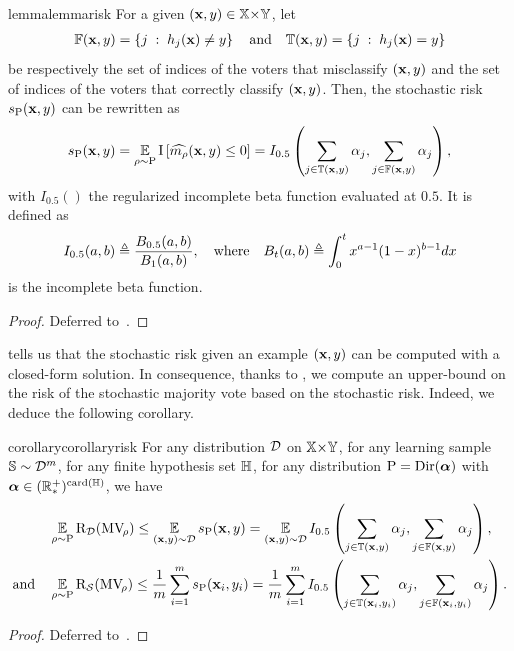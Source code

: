 \begin{restatable}{lemma}{lemmarisk}\label{chap:mv-sto:lemma:risk}
For a given $(\mathbf{x}, y) \in \mathbb{X}{\times}\mathbb{Y}$, let 
\begin{align*}
\mathbb{F}(\mathbf{x}, y) = \left\{ j \;:\; h_j(\mathbf{x}) \neq y \right\} \quad\text{and}\quad  \mathbb{T}(\mathbf{x}, y) = \left\{ j \;:\; h_j(\mathbf{x}) = y \right\}
\end{align*}
 be respectively the set of indices of the voters that misclassify $(\mathbf{x}, y)$ and the set of indices of the voters that correctly classify $(\mathbf{x}, y)$. 
Then, the stochastic risk $s_{\mathrm{P}}(\mathbf{x}, y)$ can be rewritten as
\begin{align*}
    s_{\mathrm{P}}(\mathbf{x}, y) = \operatorname*{\mathbb{E}}_{\rho\sim\mathrm{P}} \operatorname{I}\left[ \widehat{m_{\rho}}(\mathbf{x}, y) \le 0\right] =  I_{0.5}\left(\sum_{j\in \mathbb{T}(\mathbf{x}, y)} \alpha_j, \sum_{j\in \mathbb{F}(\mathbf{x}, y)} \alpha_j\right) ,
\end{align*}
with $I_{0.5}()$ the regularized incomplete beta function evaluated at $0.5$.
It is defined as
\begin{align*}
I_{0.5}(a, b)\triangleq \frac{B_{0.5}(a, b)}{B_1(a, b)}, \quad\text{where}\quad B_{t}(a, b) \triangleq \int_{0}^{t}x^{a-1}(1-x)^{b-1}dx
\end{align*}
is the incomplete beta function.
\end{restatable}
\begin{noaddcontents}\begin{proof}
Deferred to~.
\end{proof}\end{noaddcontents}

 tells us that the stochastic risk given an example $(\mathbf{x}, y)$ can be computed with a closed-form solution.
In consequence, thanks to , we compute an upper-bound on the risk of the stochastic majority vote based on the stochastic risk.
Indeed, we deduce the following corollary.

\begin{restatable}{corollary}{corollaryrisk}\label{chap:mv-sto:corollary:risk}
For any distribution $\mathcal{D}$ on $\mathbb{X}{\times}\mathbb{Y}$, for any learning sample $\mathbb{S}\sim\mathcal{D}^m$, for any finite hypothesis set $\mathbb{H}$, for any distribution $\mathrm{P}=\textrm{Dir}(\boldsymbol{\alpha})$ with $\boldsymbol{\alpha}\in(\mathbb{R}^{+}_{*})^{\operatorname{card}(\mathbb{H})}$, we have
\begin{align*}
&\operatorname*{\mathbb{E}}_{\rho\sim\mathrm{P}}\text{R}_{\mathcal{D}}(\text{MV}_{\!\rho}) \le \operatorname*{\mathbb{E}}_{(\mathbf{x},y)\sim\mathcal{D}}s_{\mathrm{P}}(\mathbf{x}, y) = \operatorname*{\mathbb{E}}_{(\mathbf{x},y)\sim\mathcal{D}} I_{0.5}\left(\sum_{j \in \mathbb{T}(\mathbf{x},y)} \alpha_j, \sum_{j \in \mathbb{F}(\mathbf{x},y)} \alpha_j\right),\\
\text{and}\quad &\operatorname*{\mathbb{E}}_{\rho\sim\mathrm{P}}\text{R}_{\mathcal{S}}(\text{MV}_{\!\rho}) \le \frac{1}{m}\sum_{i=1}^m s_{\mathrm{P}}(\mathbf{x}_i, y_i) = \frac{1}{m}\sum_{i=1}^m I_{0.5}\left(\sum_{j \in \mathbb{T}(\mathbf{x}_i,y_i)} \alpha_j, \sum_{j \in \mathbb{F}(\mathbf{x}_i,y_i)} \alpha_j\right).
\end{align*}
\end{restatable}
\begin{noaddcontents}\begin{proof}
Deferred to~.
\end{proof}\end{noaddcontents}

